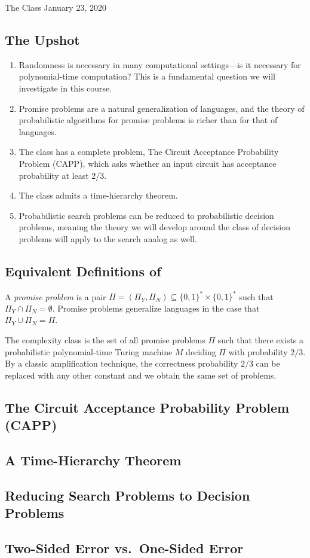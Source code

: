 \begin{lecture}{1}{The Class }{January 23, 2020}
\label{lec:01}

\subsection*{The Upshot}

\begin{enumerate}
  \item Randomness is necessary in many computational settings---is it
    necessary for polynomial-time computation? This is a fundamental question
    we will investigate in this course.
  \item Promise problems are a natural generalization of languages, and the
    theory of probabilistic algorithms for promise problems is richer than
    for that of languages.
  \item The class  has a complete problem, The Circuit Acceptance
    Probability Problem (CAPP), which asks whether an input circuit has
    acceptance probability at least 2/3.
  \item The class  admits a time-hierarchy theorem.
  \item Probabilistic search problems can be reduced to probabilistic decision
    problems, meaning the theory we will develop around the class of decision
    problems  will apply to the search analog as well.
\end{enumerate}

\subsection{Equivalent Definitions of }

A \emph{promise problem} is a pair $\Pi = (\Pi_Y, \Pi_N) \subseteq \{0, 1\}^*
\times \{0, 1\}^*$ such that $\Pi_Y \cap \Pi_N = \emptyset$. Promise problems
generalize languages in the case that $\Pi_Y \cup \Pi_N = \Pi$.

The complexity class  is the set of all promise problems $\Pi$ such
that there exists a probabilistic polynomial-time Turing machine $M$ deciding
$\Pi$ with probability $2/3$. By a classic amplification technique, the
correctness probability $2/3$ can be replaced with any other constant and we
obtain the same set of problems.

\subsection{The Circuit Acceptance Probability Problem (CAPP)}

\subsection{A Time-Hierarchy Theorem}

\subsection{Reducing Search Problems to Decision Problems}

\subsection{Two-Sided Error vs.\ One-Sided Error}

\end{lecture}
